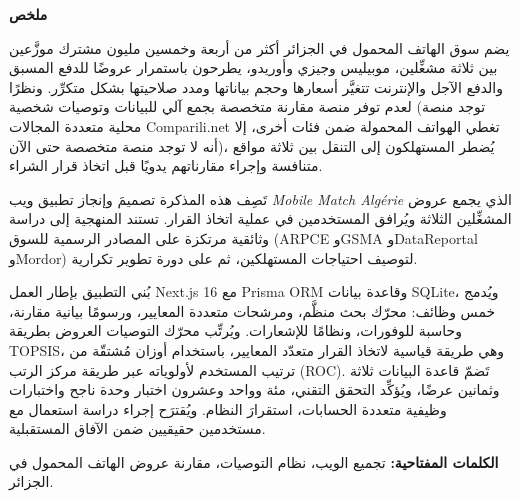 \newpage

\clearpage
\thispagestyle{plain}
{}

\begin{RTL}
{\arabicfont\onehalfspacing

{\bfseries\fontsize{14}{17}\selectfont ملخص}

\bigskip

يضم سوق الهاتف المحمول في الجزائر أكثر من أربعة وخمسين مليون مشترك موزَّعين بين
ثلاثة مشغِّلين، موبيليس وجيزي وأوريدو، يطرحون باستمرار عروضًا للدفع المسبق والدفع
الآجل والإنترنت تتغيَّر أسعارها وحجم بياناتها ومدد صلاحيتها بشكل متكرِّر. ونظرًا
لعدم توفر منصة مقارنة متخصصة بجمع آلي للبيانات وتوصيات شخصية (توجد منصة محلية
متعددة المجالات Comparili.net تغطي الهواتف المحمولة ضمن فئات أخرى، إلا أنه لا
توجد منصة متخصصة حتى الآن)، يُضطر المستهلكون إلى التنقل بين ثلاثة مواقع متنافسة
وإجراء مقارناتهم يدويًا قبل اتخاذ قرار الشراء.

\bigskip

تَصِف هذه المذكرة تصميمَ وإنجاز تطبيق ويب \textit{Mobile Match Algérie} الذي يجمع
عروض المشغِّلين الثلاثة ويُرافق المستخدمين في عملية اتخاذ القرار. تستند المنهجية إلى
دراسة وثائقية مرتكزة على المصادر الرسمية للسوق (ARPCE وGSMA وDataReportal وMordor)
لتوصيف احتياجات المستهلكين، ثم على دورة تطوير تكرارية.

\bigskip

بُني التطبيق بإطار العمل Next.js 16 مع Prisma ORM وقاعدة بيانات SQLite، ويُدمج
خمس وظائف: محرّك بحث منظَّم، ومرشحات متعددة المعايير، ورسومًا بيانية مقارنة، وحاسبة
للوفورات، ونظامًا للإشعارات. ويُرتِّب محرّك التوصيات العروض بطريقة TOPSIS، وهي طريقة قياسية لاتخاذ القرار متعدّد المعايير، باستخدام أوزان مُشتقّة من ترتيب المستخدم لأولوياته عبر طريقة مركز الرتب (ROC). تَضمّ
قاعدة البيانات ثلاثة وثمانين عرضًا، ويُؤكِّد التحقق التقني، مئة وواحد وعشرون اختبار وحدة
ناجح واختبارات وظيفية متعددة الحسابات، استقرارَ النظام. ويُقترَح
إجراء دراسة استعمال مع مستخدمين حقيقيين ضمن الآفاق المستقبلية.

\bigskip
\noindent\textbf{الكلمات المفتاحية:}
تجميع الويب،
نظام التوصيات،
مقارنة عروض الهاتف المحمول في الجزائر.

}
\end{RTL}

\newpage
